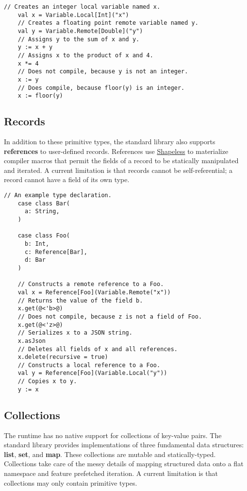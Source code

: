 \documentclass[../main.tex]{subfiles}
\begin{document}
  \begin{lstlisting}[style=Scala]
    // Creates an integer local variable named x.
    val x = Variable.Local[Int]("x")
    // Creates a floating point remote variable named y.
    val y = Variable.Remote[Double]("y")
    // Assigns y to the sum of x and y.
    y := x + y
    // Assigns x to the product of x and 4.
    x *= 4
    // Does not compile, because y is not an integer.
    x := y
    // Does compile, because floor(y) is an integer.
    x := floor(y)
  \end{lstlisting}

  \subsection{Records}
  In addition to these primitive types, the standard library also supports \textbf{references} to
  user-defined records. References use \href{https://github.com/milessabin/shapeless}{Shapeless} to
  materialize compiler macros that permit the fields of a record to be statically manipulated and
  iterated. A current limitation is that records cannot be self-referential; a record cannot have a
  field of its own type.

  \begin{lstlisting}[style=Scala]
    // An example type declaration.
    case class Bar(
      a: String,
    )

    case class Foo(
      b: Int,
      c: Reference[Bar],
      d: Bar
    )

    // Constructs a remote reference to a Foo.
    val x = Reference[Foo](Variable.Remote("x"))
    // Returns the value of the field b.
    x.get(@<'b>@)
    // Does not compile, because z is not a field of Foo.
    x.get(@<'z>@)
    // Serializes x to a JSON string.
    x.asJson
    // Deletes all fields of x and all references.
    x.delete(recursive = true)
    // Constructs a local reference to a Foo.
    val y = Reference[Foo](Variable.Local("y"))
    // Copies x to y.
    y := x
  \end{lstlisting}

  \subsection{Collections}
  The runtime has no native support for collections of key-value pairs. The standard library
  provides implementations of three fundamental data structures: \textbf{list}, \textbf{set},
  and \textbf{map}. These collections are mutable and statically-typed. Collections take care of the
  messy details of mapping structured data onto a flat namespace and feature prefetched iteration.
  A current limitation is that collections may only contain primitive types.
\end{document}
